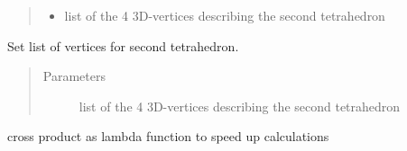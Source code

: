 \documentclass[letterpaper,10pt,english]{sphinxmanual}
\begin{document}
\begin{fulllineitems}
\begin{fulllineitems}
\begin{quote}
\begin{description}
\begin{itemize}
\item {} 
 \textendash{} list of the 4 3D-vertices describing the second tetrahedron

\end{itemize}

\end{description}\end{quote}

\end{fulllineitems}


\begin{fulllineitems}
\label{\detokenize{pk_src.collision_tet_tet:pk_src.collision_tet_tet.Collision_tet_tet.setV2}}
Set list of vertices for second tetrahedron.
\begin{quote}\begin{description}
\item[{Parameters}] \leavevmode
{} \textendash{} list of the 4 3D-vertices describing the second tetrahedron

\end{description}\end{quote}

\end{fulllineitems}


\begin{fulllineitems}
\label{\detokenize{pk_src.collision_tet_tet:pk_src.collision_tet_tet.Collision_tet_tet.shifts}}
\end{fulllineitems}


\end{fulllineitems}


\begin{fulllineitems}
\label{\detokenize{pk_src.collision_tet_tet:pk_src.collision_tet_tet.cross}}
cross product as lambda function to speed up calculations

\end{fulllineitems}
\end{document}
